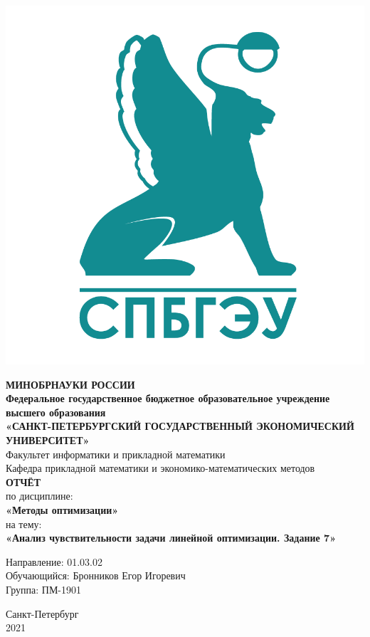 \documentclass[14pt,a4paper,fleqn]{extarticle}
\begin{document}
	\begin{titlepage}
		\includegraphics[scale=0.12]{logo}
		\begin{center}
			\textbf{МИНОБРНАУКИ РОССИИ}\\
			\vspace{0.2cm}
			\textbf{Федеральное государственное бюджетное образовательное учреждение высшего образования}\\
			\textbf{«САНКТ-ПЕТЕРБУРГСКИЙ ГОСУДАРСТВЕННЫЙ ЭКОНОМИЧЕСКИЙ УНИВЕРСИТЕТ»}\\
			\vspace{0.6cm}
			Факультет информатики и прикладной математики\\
			Кафедра прикладной математики и экономико-математических методов\\
			\vspace{1cm}
			\textbf{ОТЧЁТ}\\
			по дисциплине:\\
			\textbf{«Методы оптимизации»}\\
			на тему:\\
			\textbf{«Анализ чувствительности задачи линейной оптимизации. Задание 7»}\\
		\end{center}
		\vspace{1cm}
		Направление: 01.03.02\\
		Обучающийся: Бронников Егор Игоревич\\
		Группа: ПМ-1901\\
		\vfill
		\begin{center}
			Санкт-Петербург\\
			2021\\
		\end{center}
	\end{titlepage}
\end{document}
